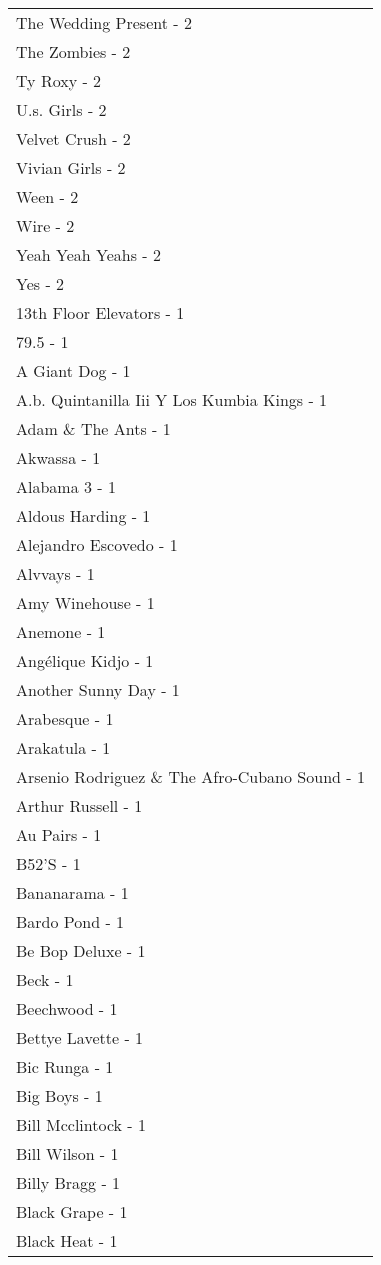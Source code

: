 \documentclass[
]{article}
\begin{document}
\begin{longtable}{l}
The Wedding Present - 2 \\ 
The Zombies - 2 \\ 
Ty Roxy - 2 \\ 
U.s. Girls - 2 \\ 
Velvet Crush - 2 \\ 
Vivian Girls - 2 \\ 
Ween - 2 \\ 
Wire - 2 \\ 
Yeah Yeah Yeahs - 2 \\ 
Yes - 2 \\ 
13th Floor Elevators - 1 \\ 
79.5 - 1 \\ 
A Giant Dog - 1 \\ 
A.b. Quintanilla Iii Y Los Kumbia Kings - 1 \\ 
Adam \& The Ants - 1 \\ 
Akwassa - 1 \\ 
Alabama 3 - 1 \\ 
Aldous Harding - 1 \\ 
Alejandro Escovedo - 1 \\ 
Alvvays - 1 \\ 
Amy Winehouse - 1 \\ 
Anemone - 1 \\ 
Angélique Kidjo - 1 \\ 
Another Sunny Day - 1 \\ 
Arabesque - 1 \\ 
Arakatula - 1 \\ 
Arsenio Rodriguez \& The Afro-Cubano Sound - 1 \\ 
Arthur Russell - 1 \\ 
Au Pairs - 1 \\ 
B52'S - 1 \\ 
Bananarama - 1 \\ 
Bardo Pond - 1 \\ 
Be Bop Deluxe - 1 \\ 
Beck - 1 \\ 
Beechwood - 1 \\ 
Bettye Lavette - 1 \\ 
Bic Runga - 1 \\ 
Big Boys - 1 \\ 
Bill Mcclintock - 1 \\ 
Bill Wilson - 1 \\ 
Billy Bragg - 1 \\ 
Black Grape - 1 \\ 
Black Heat - 1 \\ 

\end{longtable}
\end{document}
